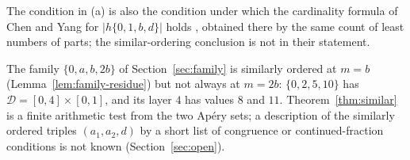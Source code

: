 The condition in (a) is also the condition under which the cardinality formula of Chen and Yang for $|h\{0,1,b,d\}|$ holds \cite[Cor.~1]{ChenYang2026}, obtained there by the same count of least numbers of parts; the similar-ordering conclusion is not in their statement.

The family $\{0,a,b,2b\}$ of Section~\ref{sec:family} is similarly ordered at $m=b$ (Lemma~\ref{lem:family-residue}) but not always at $m=2b$: $\{0,2,5,10\}$ has $\mathcal D=[0,4]\times[0,1]$, and its layer $4$ has values $8$ and $11$. Theorem~\ref{thm:similar} is a finite arithmetic test from the two Ap\'ery sets; a description of the similarly ordered triples $(a_1,a_2,d)$ by a short list of congruence or continued-fraction conditions is not known (Section~\ref{sec:open}).

